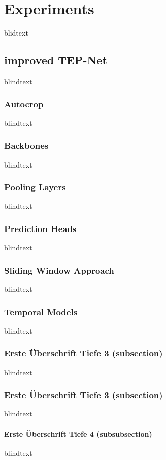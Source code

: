 \chapter{Experiments}
\label{sec:experiments}


blidtext




\section{improved TEP-Net}
blindtext

\subsection{Autocrop}
blindtext

\subsection{Backbones}
blindtext

\subsection{Pooling Layers}
blindtext

\subsection{Prediction Heads}
blindtext

\subsection{Sliding Window Approach}
blindtext

\subsection{Temporal Models}
blindtext

\subsection{Erste Überschrift Tiefe 3 (subsection)}
blindtext

\subsection{Erste Überschrift Tiefe 3 (subsection)}
blindtext

\subsubsection{Erste Überschrift Tiefe 4 (subsubsection)}
blindtext
